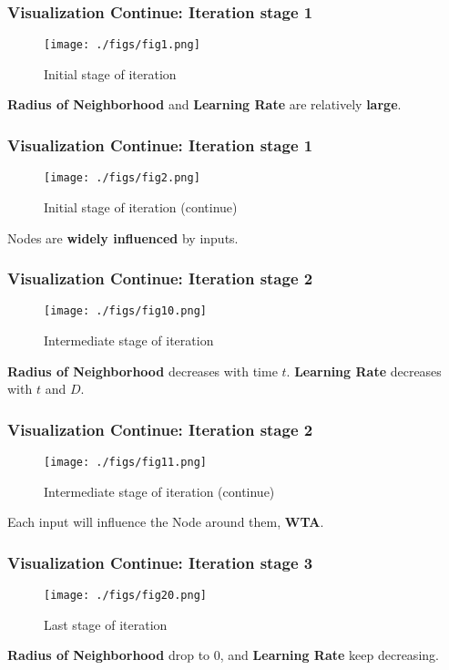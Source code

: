 \begin{frame}
    \frametitle{Visualization Continue: Iteration stage 1}
    \begin{figure}[!hp]
        \centering
        \texttt{[image: ./figs/fig1.png]}
        \caption{Initial stage of iteration}
    \end{figure}
    
    \textbf{Radius of Neighborhood} and \textbf{Learning Rate} are relatively \textbf{large}. 
\end{frame}

\begin{frame}
    \frametitle{Visualization Continue: Iteration stage 1}
    \begin{figure}[!hp]
        \centering
        \texttt{[image: ./figs/fig2.png]}
        \caption{Initial stage of iteration (continue)}
    \end{figure}
    
    Nodes are \textbf{widely influenced} by inputs. 
\end{frame}

\begin{frame}
    \frametitle{Visualization Continue: Iteration stage 2}
    \begin{figure}[!hp]
        \centering
        \texttt{[image: ./figs/fig10.png]}
        \caption{Intermediate stage of iteration}
    \end{figure}
    
    \textbf{Radius of Neighborhood} decreases with time $t$. \textbf{Learning Rate} decreases with $t$ and $D$.
\end{frame}

\begin{frame}
    \frametitle{Visualization Continue: Iteration stage 2}
    \begin{figure}[!hp]
        \centering
        \texttt{[image: ./figs/fig11.png]}
        \caption{Intermediate stage of iteration (continue)}
    \end{figure}
    
    Each input will influence the Node around them, \textbf{WTA}.
\end{frame}

\begin{frame}
    \frametitle{Visualization Continue: Iteration stage 3}
    \begin{figure}[!hp]
        \centering
        \texttt{[image: ./figs/fig20.png]}
        \caption{Last stage of iteration}
    \end{figure}
    
    \textbf{Radius of Neighborhood} drop to 0, and \textbf{Learning Rate} keep decreasing.
\end{frame}

